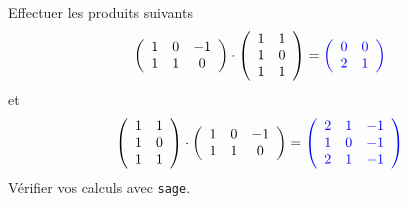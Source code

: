 \documentclass[a4paper,12pt]{article}
\newcommand{\add}[1]{\textcolor{blue}{#1}}
\begin{document}
\begin{exercice}
\begin{enumerate}
                  Effectuer les produits suivants 
                  $$\left(
                          \begin{array}{ccc}
                          1 & 0 & -1 \\
                          1 & 1 & 0
                      \end{array}
                      \right) \cdot
                    \left(
                          \begin{array}{cc}
                          1 & 1 \\
                          1 & 0 \\
                          1 & 1
                      \end{array}
                      \right) = 
                      \add{
                          \left(
                            \begin{array}{cc}
                                0 & 0 \\
                                2 & 1
                            \end{array}
                          \right)
                      }
                  $$
                      et 
                $$\left(
                          \begin{array}{cc}
                          1 & 1 \\
                          1 & 0 \\
                          1 & 1
                      \end{array}
                      \right) \cdot
                      \left(
                          \begin{array}{ccc}
                          1 & 0 & -1 \\
                          1 & 1 & 0
                      \end{array}
                      \right) = 
                      \add{
                          \left(
                            \begin{array}{ccc}
                                2 & 1 & -1 \\
                                1 & 0 & -1 \\
                                2 & 1 & -1
                            \end{array}
                          \right)
                      }
                  $$
                  Vérifier vos calculs avec {\tt sage}.
          \end{enumerate}
\end{exercice}
\end{document}
